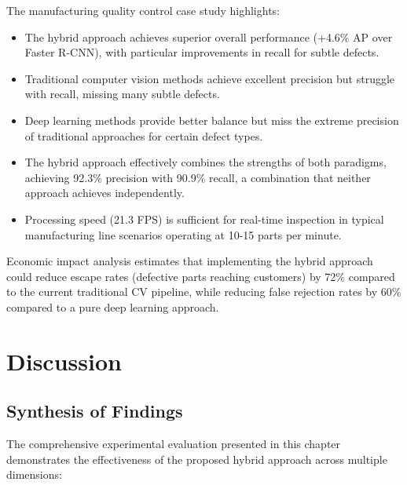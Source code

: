 The manufacturing quality control case study highlights:

\begin{itemize}
    \item The hybrid approach achieves superior overall performance (+4.6\% AP over Faster R-CNN), with particular improvements in recall for subtle defects.
    
    \item Traditional computer vision methods achieve excellent precision but struggle with recall, missing many subtle defects.
    
    \item Deep learning methods provide better balance but miss the extreme precision of traditional approaches for certain defect types.
    
    \item The hybrid approach effectively combines the strengths of both paradigms, achieving 92.3\% precision with 90.9\% recall, a combination that neither approach achieves independently.
    
    \item Processing speed (21.3 FPS) is sufficient for real-time inspection in typical manufacturing line scenarios operating at 10-15 parts per minute.
\end{itemize}

Economic impact analysis estimates that implementing the hybrid approach could reduce escape rates (defective parts reaching customers) by 72\% compared to the current traditional CV pipeline, while reducing false rejection rates by 60\% compared to a pure deep learning approach.

\section{Discussion}

\subsection{Synthesis of Findings}
The comprehensive experimental evaluation presented in this chapter demonstrates the effectiveness of the proposed hybrid approach across multiple dimensions:

